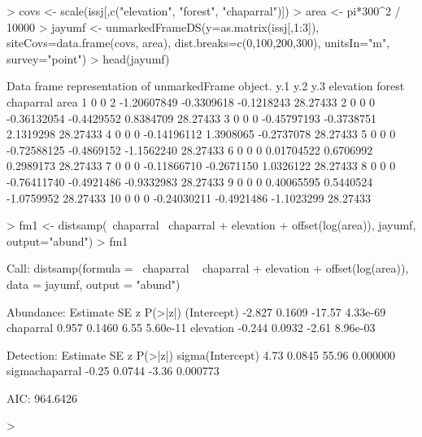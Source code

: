 \documentclass[a4paper]{article}
\renewenvironment{Schunk}{\vspace{\topsep}}{\vspace{\topsep}}
\begin{document}
\begin{Schunk}
\begin{Sinput}
> covs <- scale(issj[,c("elevation", "forest", "chaparral")])
> area <- pi*300^2 / 10000
> jayumf <- unmarkedFrameDS(y=as.matrix(issj[,1:3]),
                           siteCovs=data.frame(covs, area),
                           dist.breaks=c(0,100,200,300),
                           unitsIn="m", survey="point")
> head(jayumf)
\end{Sinput}
\begin{Soutput}
Data frame representation of unmarkedFrame object.
   y.1 y.2 y.3   elevation     forest  chaparral     area
1    0   0   2 -1.20607849 -0.3309618 -0.1218243 28.27433
2    0   0   0 -0.36132054 -0.4429552  0.8384709 28.27433
3    0   0   0 -0.45797193 -0.3738751  2.1319298 28.27433
4    0   0   0 -0.14196112  1.3908065 -0.2737078 28.27433
5    0   0   0 -0.72588125 -0.4869152 -1.1562240 28.27433
6    0   0   0  0.01704522  0.6706992  0.2989173 28.27433
7    0   0   0 -0.11866710 -0.2671150  1.0326122 28.27433
8    0   0   0 -0.76411740 -0.4921486 -0.9332983 28.27433
9    0   0   0  0.40065595  0.5440524 -1.0759952 28.27433
10   0   0   0 -0.24030211 -0.4921486 -1.1023299 28.27433
\end{Soutput}
\begin{Sinput}
> fm1 <- distsamp(~chaparral ~chaparral + elevation + offset(log(area)),
                 jayumf, output="abund")
> fm1
\end{Sinput}
\begin{Soutput}
Call:
distsamp(formula = ~chaparral ~ chaparral + elevation + offset(log(area)), 
    data = jayumf, output = "abund")

Abundance:
            Estimate     SE      z  P(>|z|)
(Intercept)   -2.827 0.1609 -17.57 4.33e-69
chaparral      0.957 0.1460   6.55 5.60e-11
elevation     -0.244 0.0932  -2.61 8.96e-03

Detection:
                 Estimate     SE     z  P(>|z|)
sigma(Intercept)     4.73 0.0845 55.96 0.000000
sigmachaparral      -0.25 0.0744 -3.36 0.000773

AIC: 964.6426 
\end{Soutput}
\begin{Sinput}
> 
\end{Sinput}
\end{Schunk}
\end{document}
